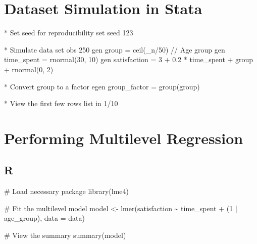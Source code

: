 \documentclass[
  letterpaper,
  DIV=11,
  numbers=noendperiod]{scrreprt}
\newenvironment{Shaded}{\begin{snugshade}}{\end{snugshade}}
\newcommand{\AttributeTok}[1]{\textcolor[rgb]{0.40,0.45,0.13}{#1}}
\newcommand{\BaseNTok}[1]{\textcolor[rgb]{0.68,0.00,0.00}{#1}}
\newcommand{\CommentTok}[1]{\textcolor[rgb]{0.37,0.37,0.37}{#1}}
\newcommand{\DataTypeTok}[1]{\textcolor[rgb]{0.68,0.00,0.00}{#1}}
\newcommand{\DecValTok}[1]{\textcolor[rgb]{0.68,0.00,0.00}{#1}}
\newcommand{\FunctionTok}[1]{\textcolor[rgb]{0.28,0.35,0.67}{#1}}
\newcommand{\KeywordTok}[1]{\textcolor[rgb]{0.00,0.23,0.31}{#1}}
\newcommand{\NormalTok}[1]{\textcolor[rgb]{0.00,0.23,0.31}{#1}}
\newcommand{\OtherTok}[1]{\textcolor[rgb]{0.00,0.23,0.31}{#1}}
\newcommand{\SpecialCharTok}[1]{\textcolor[rgb]{0.37,0.37,0.37}{#1}}
\begin{document}
\section{Dataset Simulation in
Stata}\label{dataset-simulation-in-stata-1}

\begin{Shaded}
\begin{Highlighting}[]
\NormalTok{* Set }\DecValTok{seed} \KeywordTok{for}\NormalTok{ reproducibility}
\KeywordTok{set} \DecValTok{seed}\NormalTok{ 123}

\NormalTok{* Simulate }\KeywordTok{data}
\KeywordTok{set} \KeywordTok{obs}\NormalTok{ 250}
\KeywordTok{gen} \FunctionTok{group}\NormalTok{ = }\FunctionTok{ceil}\NormalTok{(}\DataTypeTok{\_n}\NormalTok{/50)  }\CommentTok{// Age group}
\KeywordTok{gen}\NormalTok{ time\_spent = rnormal(30, 10)}
\KeywordTok{gen}\NormalTok{ satisfaction = 3 + 0.2 * time\_spent + }\FunctionTok{group}\NormalTok{ + rnormal(0, 2)}

\NormalTok{* Convert }\FunctionTok{group}\NormalTok{ to a }\KeywordTok{factor}
\KeywordTok{egen}\NormalTok{ group\_factor = }\FunctionTok{group}\NormalTok{(}\FunctionTok{group}\NormalTok{)}

\NormalTok{* View the first few }\BaseNTok{rows}
\OtherTok{list} \KeywordTok{in}\NormalTok{ 1/10}
\end{Highlighting}
\end{Shaded}

\section{Performing Multilevel
Regression}\label{performing-multilevel-regression}

\subsection{R}\label{r-2}

\begin{Shaded}
\begin{Highlighting}[]
\CommentTok{\# Load necessary package}
\FunctionTok{library}\NormalTok{(lme4)}

\CommentTok{\# Fit the multilevel model}
\NormalTok{model }\OtherTok{\textless{}{-}} \FunctionTok{lmer}\NormalTok{(satisfaction }\SpecialCharTok{\textasciitilde{}}\NormalTok{ time\_spent }\SpecialCharTok{+}\NormalTok{ (}\DecValTok{1} \SpecialCharTok{|}\NormalTok{ age\_group), }\AttributeTok{data =}\NormalTok{ data)}

\CommentTok{\# View the summary}
\FunctionTok{summary}\NormalTok{(model)}
\end{Highlighting}
\end{Shaded}
\end{document}
